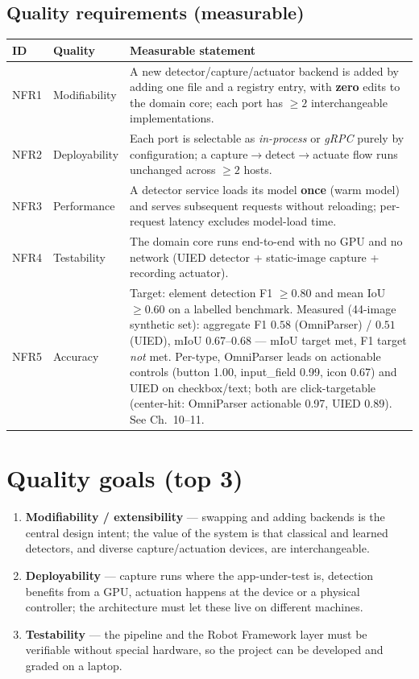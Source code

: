 \documentclass[11pt,a4paper]{report}
\newcommand{\req}[1]{\textbf{#1}}
\begin{document}
\subsection*{Quality requirements (measurable)}
\begin{longtable}{@{}p{1.6cm}p{4.0cm}p{8.6cm}@{}}
\toprule
\textbf{ID} & \textbf{Quality} & \textbf{Measurable statement} \\
\midrule
\endhead
NFR1 & Modifiability & A new detector/capture/actuator backend is added by adding one file and a registry entry, with \textbf{zero} edits to the domain core; each port has $\geq 2$ interchangeable implementations. \\
NFR2 & Deployability & Each port is selectable as \emph{in-process} or \emph{gRPC} purely by configuration; a capture$\rightarrow$detect$\rightarrow$actuate flow runs unchanged across $\geq 2$ hosts. \\
NFR3 & Performance & A detector service loads its model \textbf{once} (warm model) and serves subsequent requests without reloading; per-request latency excludes model-load time. \\
NFR4 & Testability & The domain core runs end-to-end with no GPU and no network (UIED detector + static-image capture + recording actuator). \\
NFR5 & Accuracy & Target: element detection F1 $\geq 0.80$ and mean IoU $\geq 0.60$ on a labelled benchmark. Measured (44-image synthetic set): aggregate F1 $0.58$ (OmniParser) / $0.51$ (UIED), mIoU 0.67--0.68 --- mIoU target met, F1 target \emph{not} met. Per-type, OmniParser leads on actionable controls (button 1.00, input\_field 0.99, icon 0.67) and UIED on checkbox/text; both are click-targetable (center-hit: OmniParser actionable 0.97, UIED 0.89). See Ch.~10--11. \\
\bottomrule
\end{longtable}

\section{Quality goals (top 3)}
\begin{enumerate}[leftmargin=1.6em]
  \item \req{Modifiability / extensibility} --- swapping and adding backends is the
        central design intent; the value of the system is that classical and learned
        detectors, and diverse capture/actuation devices, are interchangeable.
  \item \req{Deployability} --- capture runs where the app-under-test is, detection
        benefits from a GPU, actuation happens at the device or a physical
        controller; the architecture must let these live on different machines.
  \item \req{Testability} --- the pipeline and the Robot Framework layer must be
        verifiable without special hardware, so the project can be developed and
        graded on a laptop.
\end{enumerate}
\end{document}
